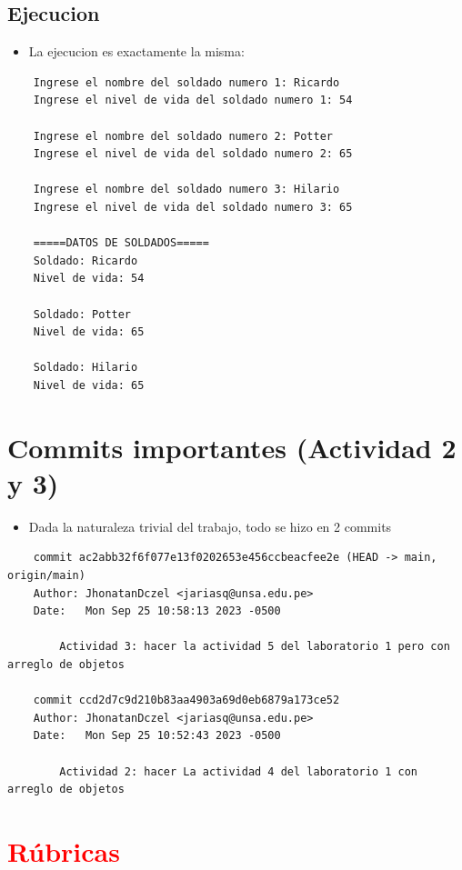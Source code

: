 \documentclass{article}
\begin{document}
\subsection{Ejecucion}
\begin{itemize}
    \item La ejecucion es exactamente la misma:
\end{itemize}
\begin{lstlisting}
    Ingrese el nombre del soldado numero 1: Ricardo
    Ingrese el nivel de vida del soldado numero 1: 54
    
    Ingrese el nombre del soldado numero 2: Potter
    Ingrese el nivel de vida del soldado numero 2: 65
    
    Ingrese el nombre del soldado numero 3: Hilario
    Ingrese el nivel de vida del soldado numero 3: 65
    
    =====DATOS DE SOLDADOS=====
    Soldado: Ricardo
    Nivel de vida: 54
    
    Soldado: Potter
    Nivel de vida: 65
    
    Soldado: Hilario
    Nivel de vida: 65
\end{lstlisting}
\section{Commits importantes (Actividad 2 y 3)}
\begin{itemize}
    \item Dada la naturaleza trivial del trabajo, todo se hizo en 2 commits
\end{itemize}
\begin{lstlisting}
    commit ac2abb32f6f077e13f0202653e456ccbeacfee2e (HEAD -> main, origin/main)
    Author: JhonatanDczel <jariasq@unsa.edu.pe>
    Date:   Mon Sep 25 10:58:13 2023 -0500
    
        Actividad 3: hacer la actividad 5 del laboratorio 1 pero con arreglo de objetos
    
    commit ccd2d7c9d210b83aa4903a69d0eb6879a173ce52
    Author: JhonatanDczel <jariasq@unsa.edu.pe>
    Date:   Mon Sep 25 10:52:43 2023 -0500
    
        Actividad 2: hacer La actividad 4 del laboratorio 1 con arreglo de objetos
\end{lstlisting}
        
	\section{\textcolor{red}{Rúbricas}}
	
\end{document}
